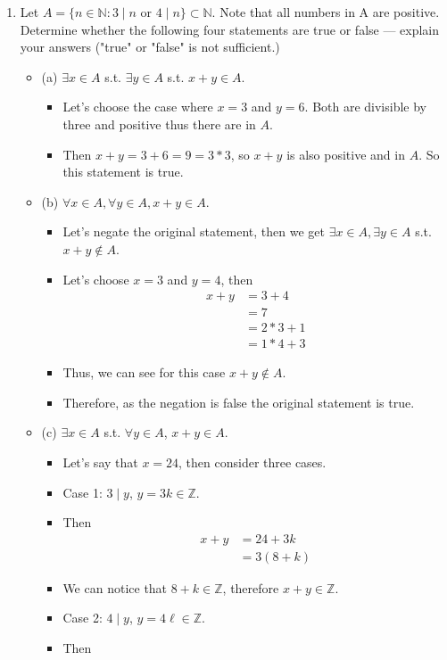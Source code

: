 \documentclass[letterpaper,12pt]{article}
\begin{document}
\begin{enumerate}
\item Let $A = \{ n \in \mathbb{N} : 3\mid n $ or $4 \mid n \} \subset \mathbb{N}$. Note that all numbers in A are positive. Determine whether the following four statements are true or false --- explain your answers ("true" or "false" is not sufficient.)
\begin{itemize}
	\item (a) $\exists x \in A $ s.t. $\exists y \in A$ s.t. $x+y \in A$.
	\begin{itemize}
	\item Let's choose the case where $x=3$ and $y=6$. Both are divisible by three and positive thus there are in $A$.
	\item Then $x+y = 3+6 = 9 = 3*3$, so $x+y$ is also positive and in $A$. So this statement is true.
	\end{itemize}
	\item (b) $\forall x \in A, \forall y \in A, x+y\in A$.
	\begin{itemize}
	\item  Let's negate the original statement, then we get $\exists x \in  A, \exists y \in A$ s.t. $x+y \notin A$.
	\item Let's choose $x=3$ and $y=4$, then  
	\begin{align}
	x+y &= 3+4 \\ &= 7 \\ &=2*3+1 \\&=1*4+3	
	\end{align}
	\item Thus, we can see for this case $x+y \notin A$. 
	\item Therefore, as the negation is false the original statement is true.
	\end{itemize}
	\item (c) $\exists x \in A$ s.t. $\forall y  \in A$, $x+y \in A$.
	\begin{itemize}
	\item Let's say that $x=24$, then consider three cases.
	\item Case 1: $3\mid y$, $y=3k \in \mathbb{Z}$.
	\item Then 
	\begin{align}
		x+y &= 24+3k \\&=3(8+k)
	\end{align}
	\item We can notice that $8+k  \in \mathbb{Z}$, therefore $x+y \in \mathbb{Z}$.
	\item Case 2: $4\mid y$, $y=4\ell \in \mathbb{Z}$.
	\item Then 

\end{itemize}
\end{itemize}
\end{enumerate}
\end{document}
